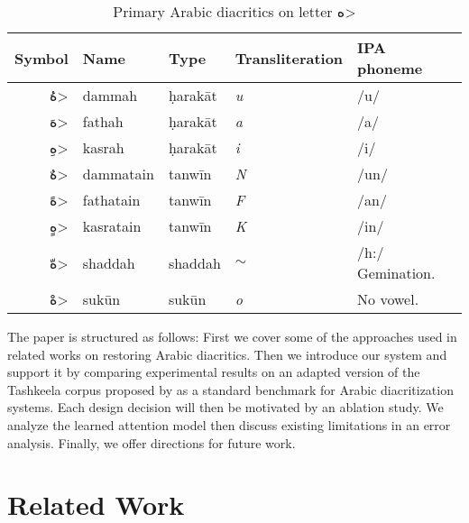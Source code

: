 \documentclass[11pt]{article}
\begin{document}
\begin{table}[ht]
\begin{center}
\begin{tabular}{|r|l|l|l|l|}
\hline 
\bf Symbol & \bf Name & \bf Type & \bf Transliteration & \bf IPA phoneme \\ \hline
\<هُ> & dammah       & \d{h}arakāt   & \it u & /u/ \\
\<هَ> & fathah       & \d{h}arakāt   & \it a & /a/ \\
\<هِ> & kasrah       & \d{h}arakāt   & \it i & /i/ \\
\<هٌ> & dammatain    & tanwīn        & \it N & /un/ \\
\<هً> & fathatain    & tanwīn        & \it F & /an/ \\
\<هٍ> & kasratain    & tanwīn        & \it K & /in/ \\
\<هّ> & shaddah      & shaddah       & $\sim$ &  /h:/ Gemination. \\
\<هْ> & sukūn        & sukūn         & \it o & No vowel. \\
\hline
\end{tabular}
\end{center}
\caption{Primary Arabic diacritics on letter \<ه>}
\label{diac-table}
\end{table}

The paper is structured as follows: First we cover some of the approaches used in related works on restoring Arabic diacritics. Then we introduce our system and support it by comparing experimental results on an adapted version of the Tashkeela corpus \cite{tashkeela17} proposed by \cite{fadel19} as a standard benchmark for Arabic diacritization systems. Each design decision will then be motivated by an ablation study. We analyze the learned attention model then discuss existing limitations in an error analysis. Finally, we offer directions for future work.

\section{Related Work}
\end{document}
